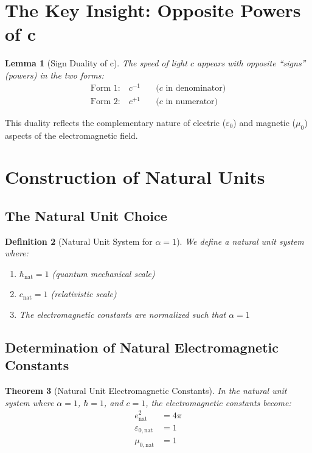 \documentclass[12pt,a4paper]{article}
\newcommand{\alphaem}{\alpha}
\newtheorem{theorem}{Theorem}[section]
\newtheorem{lemma}[theorem]{Lemma}
\newtheorem{definition}[theorem]{Definition}
\begin{document}
	\section{The Key Insight: Opposite Powers of c}
	
	\begin{lemma}[Sign Duality of c]
		The speed of light $c$ appears with opposite ``signs'' (powers) in the two forms:
		\begin{align}
			\text{Form 1:} \quad c^{-1} \quad &\text{($c$ in denominator)}\\
			\text{Form 2:} \quad c^{+1} \quad &\text{($c$ in numerator)}
		\end{align}
	\end{lemma}
	
	This duality reflects the complementary nature of electric ($\varepsilon_0$) and magnetic ($\mu_0$) aspects of the electromagnetic field.
	
	\section{Construction of Natural Units}
	
	\subsection{The Natural Unit Choice}
	
	\begin{definition}[Natural Unit System for $\alpha = 1$]
		We define a natural unit system where:
		\begin{enumerate}
			\item $\hbar_{\text{nat}} = 1$ (quantum mechanical scale)
			\item $c_{\text{nat}} = 1$ (relativistic scale)  
			\item The electromagnetic constants are normalized such that $\alphaem = 1$
		\end{enumerate}
	\end{definition}
	
	\subsection{Determination of Natural Electromagnetic Constants}
	
	\begin{theorem}[Natural Unit Electromagnetic Constants]
		In the natural unit system where $\alpha = 1$, $\hbar = 1$, and $c = 1$, the electromagnetic constants become:
		\begin{align}
			e_{\text{nat}}^2 &= 4\pi \label{eq:e_nat}\\
			\varepsilon_{0,\text{nat}} &= 1 \label{eq:eps_nat}\\
			\mu_{0,\text{nat}} &= 1 \label{eq:mu_nat}
		\end{align}
	\end{theorem}
	
\end{document}
